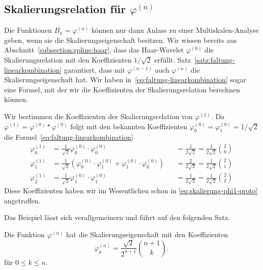 \subsection{Skalierungsrelation für $\varphi^{(n)}$
\label{subsection:skalierungsrelation-phin}}
Die Funktionen $B_n=\varphi^{(n)}$ können nur dann Anlass zu einer
Multiskalen-Analyse geben, wenn sie die Skalierungseigenschaft
besitzen.
Wir wissen bereits aus Abschnitt~\ref{subsection:spline:haar},
dass das Haar-Wavelet $\varphi^{(0)}$ die Skalierungsrelation
mit den Koeffizienten $1/\sqrt{2}$ erfüllt.
Satz~\ref{satz:faltung-linearkombination} garantiert, dass mit
$\varphi^{(n-1)}$ auch $\varphi^{(n)}$ die Skalierungseigenschaft hat.
Wir haben in~\eqref{eq:faltung-linearkombination}
sogar eine Formel, mit der wir die Koeffizienten der Skalierungsrelation
berechnen können.

\begin{beispiel}
Wir bestimmen die Koeffizienten der Skalierungsrelation von $\varphi^{(1)}$.
Da $\varphi^{(1)}=\varphi^{(0)}*\varphi^{(0)}$ folgt mit den bekannten
Koeffizienten $\varphi^{(0)}_0=\varphi^{(0)}_1=1/\sqrt{2}$ die
Formel~\eqref{eq:faltung-linearkombination}
\[
\begin{aligned}
\varphi^{(1)}_0
&=
\frac1{\sqrt{2}}
\varphi^{(0)}_0
\cdot
\varphi^{(0)}_0
&&=
\frac{1}{2\sqrt{2}}
=\frac{1}{2\sqrt{2}}\binom{2}{0}
\\
\varphi^{(1)}_1
&=
\frac1{\sqrt{2}}
(
\varphi^{(0)}_0
\cdot
\varphi^{(0)}_1
+
\varphi^{(0)}_1
\cdot
\varphi^{(0)}_0
)
&&=
\frac{2}{2\sqrt{2}}
=\frac{1}{2\sqrt{2}}\binom{2}{1}
\\
\varphi^{(1)}_2
&=
\frac1{\sqrt{2}}
\varphi^{(0)}_1
\cdot
\varphi^{(0)}_1
&&=
\frac{1}{2\sqrt{2}}
=\frac{1}{2\sqrt{2}}\binom{2}{2}
\end{aligned}
\]
Diese Koeffizienten haben wir im Wesentlichen schon in
\eqref{eq:skalierung-phi1-proto} angetroffen.
\end{beispiel}

Das Beispiel lässt sich verallgemeinern und führt auf den folgenden Satz.

\begin{satz}
Die Funktion $\varphi^{(n)}$ hat die Skalierungseigenschaft  mit den
Koeffizienten
\[
\varphi^{(n)}_k = \frac{\sqrt{2}}{2^{n+1}}\binom{n+1}{k}.
\]
für $0\le k\le n$.
\end{satz}




